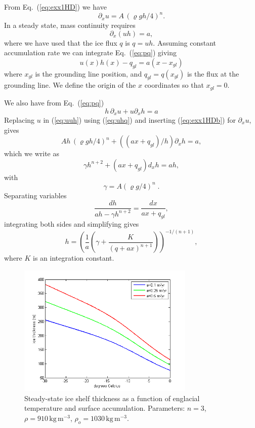 \documentclass[10pt,a4paper]{book}
\newcommand{\p}{\partial}
\begin{document}
From Eq.~(\ref{eq:exx1HD}) we have
\begin{equation}
\p_x u= A \, (\varrho g h/4)^n .
\label{eq:exx1HDb}
\end{equation}
In a steady state, mass continuity requires
\begin{equation}
\p_x (uh)=a ,
\label{eq:pq}
\end{equation}
where we have used that the ice flux $q$ is $q=uh$.
Assuming constant accumulation rate we can integrate Eq.~(\ref{eq:pq}) giving
\begin{equation}
u(x) h(x) -q_{gl} = a (x-x_{gl})
\label{eq:uhq}
\end{equation}
where $x_{gl}$ is the grounding line position, and $q_{gl}=q(x_{gl})$
is the flux at the grounding line. We define the origin of the $x$
coordinates so that $x_{gl}=0$.


We also have from Eq.~(\ref{eq:pq}) \
\begin{equation}
h\, \p_x u + u \p_x h=a
\label{eq:uuh}
\end{equation}
Replacing $u$ in (\ref{eq:uuh}) using (\ref{eq:uhq}) and inserting (\ref{eq:exx1HDb})
for $\p_x u$, gives
\begin{equation}
 A h\, (\varrho g h/4)^n   +  ((a x+q_{gl})/h) \p_x h=a,
\end{equation}
which we write as
\begin{equation}
  \gamma h^{n+2}   +   (a x+q_{gl}) d_x h= a h,
\label{eq:gxh}
\end{equation}
with
\[
\gamma=A (\varrho g/4)^n \; .
\]
Separating variables
\begin{equation}
  \frac{dh}{a h-\gamma h^{n+2}} = \frac{dx}{a x+q_{gl}},
  \label{eq:gxh3}
\end{equation}
integrating both sides and simplifying gives
\begin{equation}
  h=\left ( \frac{1}{a}\left (\gamma+\frac{K}{(q+a x)^{n+1}} \right ) \right )^{-1/(n+1)},
\end{equation}
where $K$ is an integration constant.


\begin{figure}
\centering
\includegraphics[width=0.75\textwidth]{1dSteadyStateIceShelf.png}
\caption{\label{fig:ssiceshelf}
Steady-state ice shelf thickness as a function of englacial
  temperature and surface accumulation.  
Parameters: $n=3$, $\rho=910 \, \mathrm{kg \,
    m^{-3}}$, $\rho_o=1030 \, \mathrm{kg \, m^{-3}}$.}
\end{figure}
\end{document}
